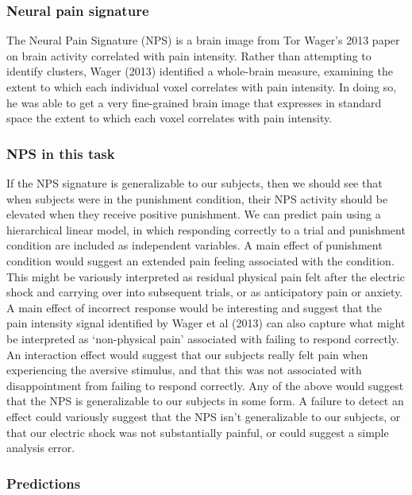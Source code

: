 \documentclass[]{article}
\begin{document}
\subsubsection{Neural pain signature}\label{neural-pain-signature}

The Neural Pain Signature (NPS) is a brain image from Tor Wager's 2013
paper on brain activity correlated with pain intensity. Rather than
attempting to identify clusters, Wager (2013) identified a whole-brain
measure, examining the extent to which each individual voxel correlates
with pain intensity. In doing so, he was able to get a very fine-grained
brain image that expresses in standard space the extent to which each
voxel correlates with pain intensity.

\subsubsection{NPS in this task}\label{nps-in-this-task}

If the NPS signature is generalizable to our subjects, then we should
see that when subjects were in the punishment condition, their NPS
activity should be elevated when they receive positive punishment. We
can predict pain using a hierarchical linear model, in which responding
correctly to a trial and punishment condition are included as
independent variables. A main effect of punishment condition would
suggest an extended pain feeling associated with the condition. This
might be variously interpreted as residual physical pain felt after the
electric shock and carrying over into subsequent trials, or as
anticipatory pain or anxiety. A main effect of incorrect response would
be interesting and suggest that the pain intensity signal identified by
Wager et al (2013) can also capture what might be interpreted as
`non-physical pain' associated with failing to respond correctly. An
interaction effect would suggest that our subjects really felt pain when
experiencing the aversive stimulus, and that this was not associated
with disappointment from failing to respond correctly. Any of the above
would suggest that the NPS is generalizable to our subjects in some
form. A failure to detect an effect could variously suggest that the NPS
isn't generalizable to our subjects, or that our electric shock was not
substantially painful, or could suggest a simple analysis error.

\subsubsection{Predictions}\label{predictions}
\end{document}
